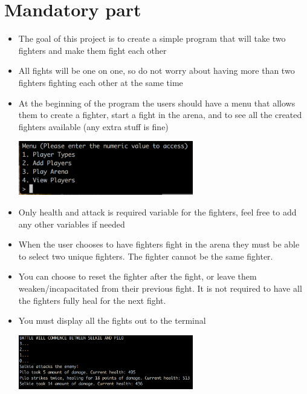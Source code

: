 \documentclass{42-en}
\begin{document}
\chapter{Mandatory part}


	\begin{itemize}
		\item The goal of this project is to create a simple program
		that will take two fighters and make them fight each other
		\item All fights will be one on one, so do not worry about having
		more than two fighters fighting each other at the same time
		\item At the beginning of the program the users should have a menu
		that allows them to create a fighter, start a fight in the arena,
		and to see all the created fighters available (any extra stuff is fine)

	\begin{center}
		\includegraphics[width=0.6\textwidth]{images/menu.png}
	\end{center}

		\item Only health and attack is required variable for the fighters,
		feel free to add any other variables if needed
		\item When the user chooses to have fighters fight in the arena
		they must be able to select two unique fighters. The fighter cannot
		be the same fighter.
		\item You can choose to reset the fighter after the fight, or leave
		them weaken/incapacitated from their previous fight. It is not required
		to have all the fighters fully heal for the next fight.
		\item You must display all the fights out to the terminal

	\begin{center}
		\includegraphics[width=0.6\textwidth]{images/fight.png}
	\end{center}


\end{itemize}
\end{document}
